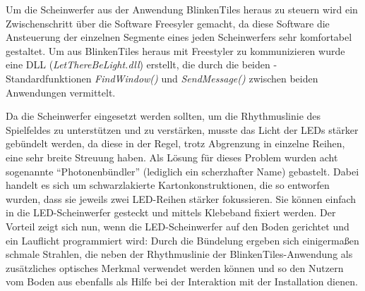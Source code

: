 Um die Scheinwerfer aus der Anwendung BlinkenTiles heraus zu steuern wird ein Zwischenschritt über die Software Freesyler gemacht, da diese Software die Ansteuerung der einzelnen Segmente eines jeden Scheinwerfers sehr komfortabel gestaltet. Um aus BlinkenTiles heraus mit Freestyler zu kommunizieren wurde eine DLL (\emph{LetThereBeLight.dll}) erstellt, die durch die beiden \CS{}-Standardfunktionen \emph{FindWindow()} und \emph{SendMessage()} zwischen beiden Anwendungen vermittelt.

Da die Scheinwerfer eingesetzt werden sollten, um die Rhythmuslinie des Spielfeldes zu unterstützen und zu verstärken, musste das Licht der LEDs stärker gebündelt werden, da diese in der Regel, trotz Abgrenzung in einzelne Reihen, eine sehr breite Streuung haben. Als Lösung für dieses Problem wurden acht sogenannte \enquote{Photonenbündler} (lediglich ein scherzhafter Name) gebastelt. Dabei handelt es sich um schwarzlakierte Kartonkonstruktionen, die so entworfen wurden, dass sie jeweils zwei LED-Reihen stärker fokussieren. Sie können einfach in die LED-Scheinwerfer gesteckt und mittels Klebeband fixiert werden. Der Vorteil zeigt sich nun, wenn die LED-Scheinwerfer auf den Boden gerichtet und ein Lauflicht programmiert wird: Durch die Bündelung ergeben sich einigermaßen schmale Strahlen, die neben der Rhythmuslinie der BlinkenTiles-Anwendung als zusätzliches optisches Merkmal verwendet werden können und so den Nutzern vom Boden aus ebenfalls als Hilfe bei der Interaktion mit der Installation dienen.


